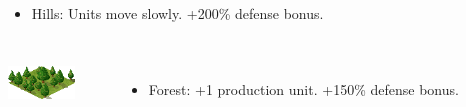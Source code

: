\begin{frame}
\begin{columns}
		\begin{itemize}
			\item Hills: Units move slowly. +200\% defense bonus.
		\end{itemize}
	\end{columns}

	\vspace{1em}
	
	\begin{columns}
		\centering \includegraphics[width=0.7\textwidth]{images/forest.png}
		
		\begin{itemize}
			\item Forest: +1 production unit. +150\% defense bonus.
		\end{itemize}
	\end{columns}
\end{frame}

